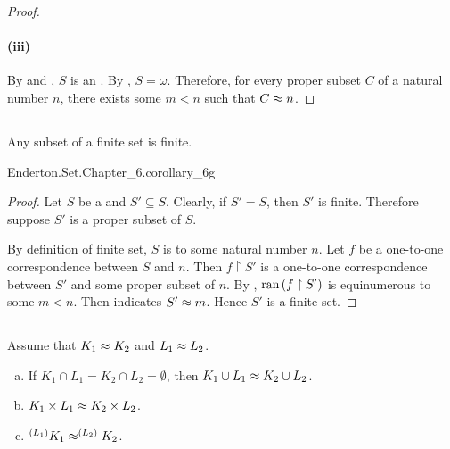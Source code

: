 \documentclass{report}
\begin{document}
\begin{proof}
    \paragraph{(iii)}%

      By  and , $S$ is an
        .
      By , $S = \omega$.
      Therefore, for every proper subset $C$ of a natural number $n$, there
        exists some $m < n$ such that $C \approx n$.

  \end{proof}

\subsection{}%

  \begin{corollary}[6G]
    Any subset of a finite set is finite.
  \end{corollary}

    {Enderton.Set.Chapter\_6.corollary\_6g}

  \begin{proof}
    Let $S$ be a  and $S' \subseteq S$.
    Clearly, if $S' = S$, then $S'$ is finite.
    Therefore suppose $S'$ is a proper subset of $S$.

    By definition of finite set, $S$ is  to some
      natural number $n$.
    Let $f$ be a one-to-one correspondence between $S$ and $n$.
    Then $f \restriction S'$ is a one-to-one correspondence between $S'$ and
      some proper subset of $n$.
    By , $\mathop{\text{ran}}{(f \restriction S')}$ is equinumerous to
      some $m < n$.
    Then  indicates $S' \approx m$.
    Hence $S'$ is a finite set.
  \end{proof}

\subsection{}%

  Assume that $K_1 \approx K_2$ and $L_1 \approx L_2$.
    \begin{enumerate}[(a)]
      \item If $K_1 \cap L_1 = K_2 \cap L_2 = \emptyset$, then
        $K_1 \cup L_1 \approx K_2 \cup L_2$.
      \item $K_1 \times L_1 \approx K_2 \times L_2$.
      \item $^{(L_1)}{K_1} \approx ^{(L_2)}{K_2}$.
    \end{enumerate}
\end{document}
